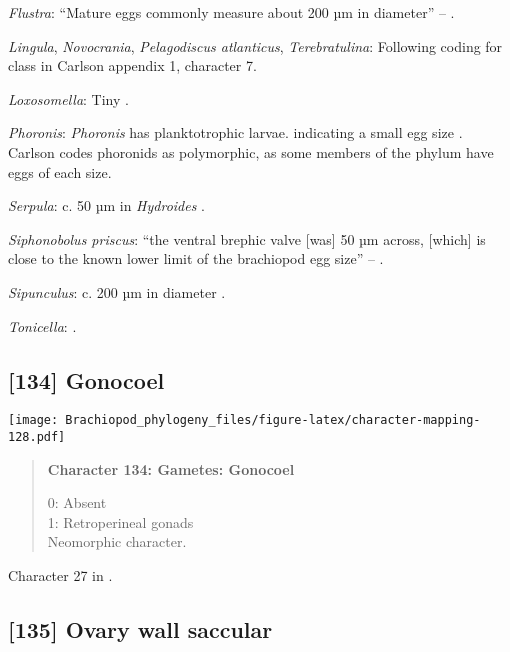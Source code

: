 \documentclass[openany]{book}
\theoremstyle{definition}
\theoremstyle{definition}
\theoremstyle{definition}
\theoremstyle{remark}
\begin{document}
\hypertarget{Flustra-coding-133}{}
\emph{Flustra}: ``Mature eggs commonly measure about 200 µm in
diameter'' -- \citet{Franzen1977}.

\hypertarget{Lingula-coding-133}{}
\emph{Lingula}, \emph{Novocrania}, \emph{Pelagodiscus atlanticus},
\emph{Terebratulina}: Following coding for class in Carlson
\citeyearpar{Carlson1995Phylogeneticrelationships} appendix 1, character
7.

\hypertarget{Loxosomella-coding-133}{}
\emph{Loxosomella}: Tiny \citep{Nielsen1966}.

\hypertarget{Phoronis-coding-133}{}
\emph{Phoronis}: \emph{Phoronis} has planktotrophic larvae. indicating a
small egg size \citep{Ruppert2004Invertebratezoology}. Carlson
\citeyearpar{Carlson1995Phylogeneticrelationships} codes phoronids as
polymorphic, as some members of the phylum have eggs of each size.

\hypertarget{Serpula-coding-133}{}
\emph{Serpula}: c. 50 µm in \emph{Hydroides} \citep{Miles2007}.

\hypertarget{Siphonobolus_priscus-coding-133}{}
\emph{Siphonobolus priscus}: ``the ventral brephic valve {[}was{]} 50 µm
across, {[}which{]} is close to the known lower limit of the brachiopod
egg size'' -- \citet{Popov2009Earlyontogeny}.

\hypertarget{Sipunculus-coding-133}{}
\emph{Sipunculus}: c. 200 µm in diameter \citep{Rice1988}.

\hypertarget{Tonicella-coding-133}{}
\emph{Tonicella}: \citet{BucklandNicks1988}.

\subsection*{{[}134{]} Gonocoel}\label{gonocoel}

\texttt{[image: Brachiopod\_phylogeny\_files/figure-latex/character-mapping-128.pdf]}

\begin{quote}
\textbf{Character 134: Gametes: Gonocoel}

0: Absent\\
1: Retroperineal gonads\\
Neomorphic character.
\end{quote}

Character 27 in \citet{Haszprunar1996}.

\subsection*{{[}135{]} Ovary wall saccular}\label{ovary-wall-saccular}
\end{document}
